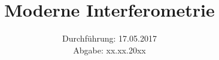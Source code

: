 

\subject{Versuch 64}
\title{Moderne Interferometrie}
\date{Durchführung: 17.05.2017 \\
      Abgabe: xx.xx.20xx}



\maketitle
\newpage






\nocite{V64}

\printbibliography



